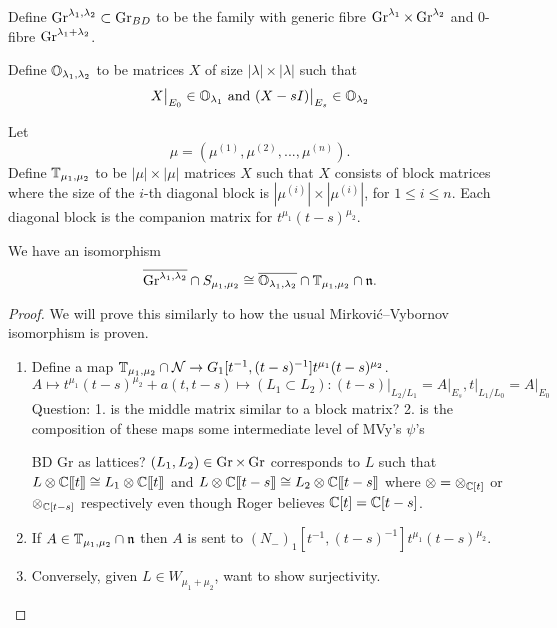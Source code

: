 \documentclass{article}
\begin{document}
Define $\operatorname{Gr}^{\lambda_1, \lambda_2} \subset \operatorname{Gr}_{BD}$ to be the family with generic fibre $\operatorname{Gr}^{\lambda_1} \times \operatorname{Gr}^{\lambda_2}$ and 0-fibre $\operatorname{Gr}^{\lambda_1 + \lambda_2}$.

Define $\mathbb O_{\lambda_1, \lambda_2}$ to be matrices $X$ of size $|\lambda| \times |\lambda|$ such that 
\[
        X\big|_{E_0} \in \mathbb O_{\lambda_1} 
        \text{ and }
        (X-sI)\big|_{E_s} \in \mathbb O_{\lambda_2}
\]

Let 
\[
\mu = (\mu^{(1)}, \mu^{(2)}, ..., \mu^{(n)}).
\]
Define $\mathbb T_{\mu_1, \mu_2}$ to be $|\mu| \times |\mu|$ matrices $X$ such that $X$ consists of block matrices where the size of the $i$-th diagonal block is $|\mu^{(i)}| \times |\mu^{(i)}|$, for $1\leq i \leq n$. Each diagonal block is the companion matrix for $t^{\mu_1}(t-s)^{\mu_2}$.

\begin{theorem}
We have an isomorphism
\[
    \overline{\operatorname{Gr}^{\lambda_1, \lambda_2}} \cap S_{\mu_1, \mu_2} \cong
    \overline{\mathbb O_{\lambda_1, \lambda_2}} \cap \mathbb T_{\mu_1, \mu_2} \cap \mathfrak n.
\]
\end{theorem}


\begin{proof}
We will prove this similarly to how the usual Mirkovi\'c--Vybornov isomorphism is proven.
\begin{enumerate}[label = Step \arabic*:]
    \item Define a map $\mathbb T_{\mu_1, \mu_2} \cap \mathcal N \rightarrow G_1[t^{-1}, (t-s)^{-1}] t^{\mu_1} (t-s)^{\mu_2}$.
    $$
    A \mapsto t^{\mu_1} (t-s)^{\mu_2} + a(t, t-s) \mapsto (L_1 \subset L_2) : (t-s)\big|_{L_2/L_1} = A\big|_{E_s}  , t\big|_{L_1/L_0} = A\big|_{E_0}
    $$
    Question: 1. is the middle matrix similar to a block matrix? 2. is the composition of these maps some intermediate level of MVy's $\psi$'s 

    BD Gr as lattices? $(L_1,L_2)\in\operatorname{Gr}\times\operatorname{Gr}$ corresponds to $L$ such that $L\otimes\mathbb C[\hspace{-.12em}[ {t} ]\hspace{-.12em}]\cong L_1\otimes\mathbb C[\hspace{-.12em}[ {t} ]\hspace{-.12em}]$ and $L\otimes\mathbb C[\hspace{-.12em}[ {t-s} ]\hspace{-.12em}]\cong L_2\otimes\mathbb C[\hspace{-.12em}[ {t-s} ]\hspace{-.12em}]$ where $\otimes = \otimes_{\mathbb C[t]}$ or $\otimes_{\mathbb C[t-s]}$ respectively even though Roger believes $\mathbb C[t] = \mathbb C[t-s]$.  

    \item If $A \in \mathbb T_{\mu_1,\mu_2} \cap \mathfrak n$ then $A$ is sent to $(N_-)_1[t^{-1}, (t-s)^{-1}] t^{\mu_1} (t-s)^{\mu_2}$. 

    \item Conversely, given $L \in W_{\mu_1 + \mu_2}$, want to show surjectivity.
\end{enumerate}
\end{proof}



\end{document}
